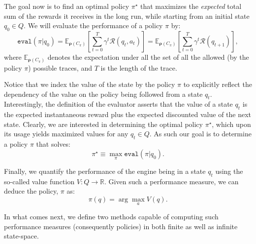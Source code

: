 The goal now is to find an optimal policy $\pi^{\star}$ that maximizes the \emph{expected} total sum of the rewards it receives in the long run, while starting from an initial state $q_{0} \in Q$. We will evaluate the performance of a policy $\pi$ by:
\begin{equation}
\label{Eq:ValueOne}
\texttt{eval}({\pi}|q_{0}) = \mathbb{E}_{\bm{\rho}(C_\pi)} \left[\sum_{t=0}^{T} \gamma^{t}\mathcal{R}(q_{t},a_{t})\right]= \mathbb{E}_{\bm{\rho}(C_\pi)} \left[\sum_{t=0}^{T} \gamma^{t}\mathcal{R}(q_{t+1})\right],
\end{equation}
where  $\mathbb{E}_{\bm{\rho}(C_\pi)}$ denotes the expectation under all the set of all the allowed (by the policy $\pi$) possible traces, and $T$ is the length of the trace. 


Notice that we index the value of the state by the policy $\pi$ to explicitly reflect the dependency of the value on the policy being followed from a state $q_{t}$. Interestingly, the definition of the evaluator asserts that the value of a state $q_{t}$ is the expected instantaneous reward plus the expected discounted value of the next state. Clearly, we are interested in determining the optimal policy $\pi^{\star}$, which upon its usage yields maximized values for any $q_{t} \in Q$. As such our goal is to determine a policy $\pi$ that solves:
\begin{equation*}
\pi^{\star} \equiv \max_{\pi} \texttt{eval}({\pi}|q_{0}). 
\end{equation*}



Finally, we quantify the performance of the engine being in a state $q_{t}$ using the so-called value function $V: {Q} \rightarrow \mathbb{R}$. Given such a performance measure, we can deduce the policy, $\pi$ as: 
\begin{equation}
\label{Eq:Policy}
\pi(q) = \arg\max_{a} V(q).
\end{equation}

In what comes next, we define two methods capable of computing such performance measures (consequently policies) in both finite as well as infinite state-space. 

